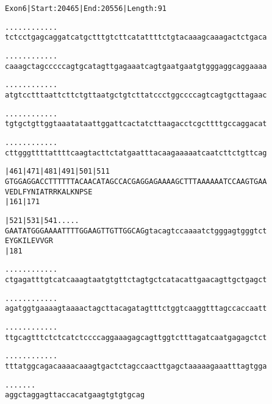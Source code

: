 \documentclass{article}
\begin{document}
\begin{alltt}
Exon 6 | Start: 20465 | End: 20556 | Length: 91

.    .    .    .    .    .    .    .    .    .    .    .    
tctcctgagcaggatcatgctttgtcttcatattttctgtacaaagcaaagactctgaca

.    .    .    .    .    .    .    .    .    .    .    .    
caaagctagcccccagtgcatagttgagaaatcagtgaatgaatgtgggaggcaggaaaa

.    .    .    .    .    .    .    .    .    .    .    .    
atgtcctttaattcttctgttaatgctgtcttatccctggccccagtcagtgcttagaac

.    .    .    .    .    .    .    .    .    .    .    .    
tgtgctgttggtaaatataattggattcactatcttaagacctcgcttttgccaggacat

.    .    .    .    .    .    .    .    .    .    .    .    
cttgggttttattttcaagtacttctatgaatttacaagaaaaatcaatcttctgttcag

       |461      |471      |481      |491      |501      |511
GTGGAGGACCTTTTTTACAACATAGCCACGAGGAGAAAAGCTTTAAAAAATCCAAGTGAA
V  E  D  L  F  Y  N  I  A  T  R  R  K  A  L  K  N  P  S  E  
                           |161                          |171

       |521      |531      |541     .    .    .    .    .   
GAATATGGGAAAATTTTGGAAGTTGTTGGCAGgtacagtccaaaatctgggagtgggtct
E  Y  G  K  I  L  E  V  V  G  R                             
                           |181                             

 .    .    .    .    .    .    .    .    .    .    .    .   
ctgagatttgtcatcaaagtaatgtgttctagtgctcatacattgaacagttgctgagct

 .    .    .    .    .    .    .    .    .    .    .    .   
agatggtgaaaagtaaaactagcttacagatagtttctggtcaaggtttagccaccaatt

 .    .    .    .    .    .    .    .    .    .    .    .   
ttgcagtttctctcatctccccaggaaagagcagttggtctttagatcaatgagagctct

 .    .    .    .    .    .    .    .    .    .    .    .   
tttatggcagacaaaacaaagtgactctagccaacttgagctaaaaagaaatttagtgga

 .    .    .    .    .    .    .
aggctaggagttaccacatgaagtgtgtgcag
\end{alltt}
\newpage
\end{document}

